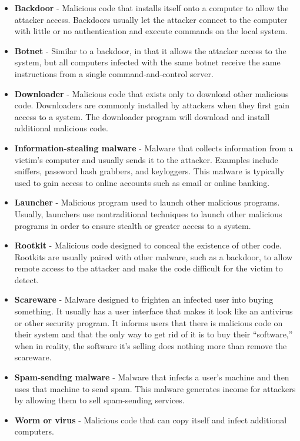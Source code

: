 \begin{itemize}
    \item \textbf{Backdoor} - Malicious code that installs itself onto a computer to allow the attacker access. Backdoors usually let the attacker connect to the computer with little or no authentication and execute commands on the local system.
    \item \textbf{Botnet} - Similar to a backdoor, in that it allows the attacker access to the system, but all computers infected with the same botnet receive the same instructions from a single command-and-control server.
    \item \textbf{Downloader} - Malicious code that exists only to download other malicious code. Downloaders are commonly installed by attackers when they first gain access to a system. The downloader program will download and install additional malicious code.
    \item \textbf{Information-stealing malware} - Malware that collects information from a victim’s computer and usually sends it to the attacker. Examples include sniffers, password hash grabbers, and keyloggers. This malware is typically used to gain access to online accounts such as email or online banking.
    \item \textbf{Launcher} - Malicious program used to launch other malicious programs. Usually, launchers use nontraditional techniques to launch other malicious programs in order to ensure stealth or greater access to a system.
    \item \textbf{Rootkit} - Malicious code designed to conceal the existence of other code. Rootkits are usually paired with other malware, such as a backdoor, to allow remote access to the attacker and make the code difficult for the victim to detect.
    \item \textbf{Scareware} - Malware designed to frighten an infected user into buying something. It usually has a user interface that makes it look like an antivirus or other security program. It informs users that there is malicious code on their system and that the only way to get rid of it is to buy their “software,” when in reality, the software it’s selling does nothing more than remove the scareware.
    \item \textbf{Spam-sending malware} - Malware that infects a user’s machine and then uses that machine to send spam. This malware generates income for attackers by allowing them to sell spam-sending services.
    \item \textbf{Worm or virus} - Malicious code that can copy itself and infect additional computers.
\end{itemize}

